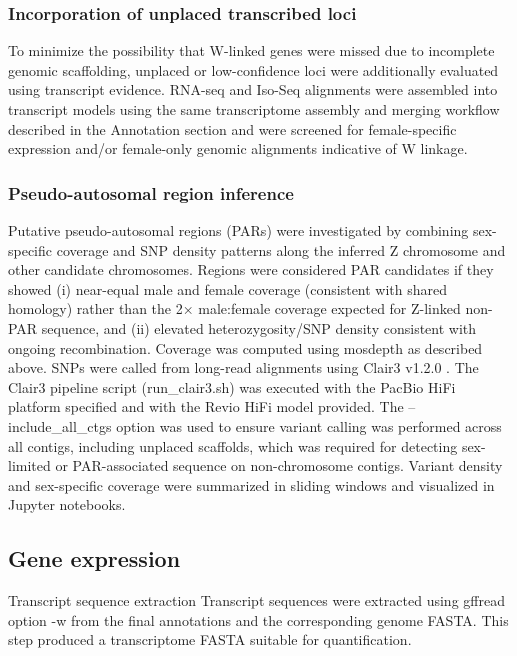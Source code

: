 \documentclass[11pt]{article}
\begin{document}
\subsubsection{Incorporation of unplaced transcribed loci}

To minimize the possibility that W-linked genes were missed due to incomplete genomic scaffolding, unplaced or low-confidence loci were additionally evaluated using transcript evidence. RNA-seq and Iso-Seq alignments were assembled into transcript models using the same transcriptome assembly and merging workflow described in the Annotation section and were screened for female-specific expression and/or female-only genomic alignments indicative of W linkage.

\subsubsection{Pseudo-autosomal region inference}

Putative pseudo-autosomal regions (PARs) were investigated by combining sex-specific coverage and SNP density patterns along the inferred Z chromosome and other candidate chromosomes. Regions were considered PAR candidates if they showed (i) near-equal male and female coverage (consistent with shared homology) rather than the 2× male:female coverage expected for Z-linked non-PAR sequence, and (ii) elevated heterozygosity/SNP density consistent with ongoing recombination. Coverage was computed using mosdepth as described above. SNPs were called from long-read alignments using Clair3 v1.2.0 \cite{Chang2024Clair3}. The Clair3 pipeline script (run\_clair3.sh) was executed with the PacBio HiFi platform specified and with the Revio HiFi model provided. The --include\_all\_ctgs option was used to ensure variant calling was performed across all contigs, including unplaced scaffolds, which was required for detecting sex-limited or PAR-associated sequence on non-chromosome contigs. Variant density and sex-specific coverage were summarized in sliding windows and visualized in Jupyter notebooks.

\subsection{Gene expression }

Transcript sequence extraction
Transcript sequences were extracted using gffread option -w from the final annotations and the corresponding genome FASTA. This step produced a transcriptome FASTA suitable for quantification. 
\end{document}
